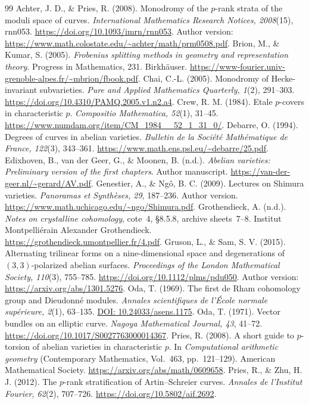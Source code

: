 \documentclass[11pt]{article}
\theoremstyle{definition}\newtheorem{definition}[theorem]{Definition}
\theoremstyle{remark}\newtheorem{remark}[theorem]{Remark}
\begin{document}
\begin{thebibliography}{99}
Achter, J. D., \& Pries, R. (2008). Monodromy of the $p$-rank strata of the moduli space of curves. \emph{International Mathematics Research Notices, 2008}(15), rnn053. \url{https://doi.org/10.1093/imrn/rnn053}. Author version: \url{https://www.math.colostate.edu/~achter/math/prm0508.pdf}.
Brion, M., \& Kumar, S. (2005). \emph{Frobenius splitting methods in geometry and representation theory}. Progress in Mathematics, 231. Birkh\"auser. \url{https://www-fourier.univ-grenoble-alpes.fr/~mbrion/fbook.pdf}.
Chai, C.-L. (2005). Monodromy of Hecke-invariant subvarieties. \emph{Pure and Applied Mathematics Quarterly, 1}(2), 291--303. \url{https://doi.org/10.4310/PAMQ.2005.v1.n2.a4}.
Crew, R. M. (1984). Etale $p$-covers in characteristic $p$. \emph{Compositio Mathematica, 52}(1), 31--45. \url{https://www.numdam.org/item/CM_1984__52_1_31_0/}.
Debarre, O. (1994). Degrees of curves in abelian varieties. \emph{Bulletin de la Soci\'et\'e Math\'ematique de France, 122}(3), 343--361. \url{https://www.math.ens.psl.eu/~debarre/25.pdf}.
Edixhoven, B., van der Geer, G., \& Moonen, B. (n.d.). \emph{Abelian varieties: Preliminary version of the first chapters}. Author manuscript. \url{https://van-der-geer.nl/~gerard/AV.pdf}.
Genestier, A., \& Ng{\^o}, B. C. (2009). Lectures on Shimura varieties. \emph{Panoramas et Synth\`eses, 29}, 187--236. Author version. \url{https://www.math.uchicago.edu/~ngo/Shimura.pdf}.
Grothendieck, A. (n.d.). \emph{Notes on crystalline cohomology}, cote~4, \S8.5.8, archive sheets~7--8. Institut Montpelli\'erain Alexander Grothendieck. \url{https://grothendieck.umontpellier.fr/4.pdf}.
Gruson, L., \& Sam, S. V. (2015). Alternating trilinear forms on a nine-dimensional space and degenerations of $(3,3)$-polarized abelian surfaces. \emph{Proceedings of the London Mathematical Society, 110}(3), 755--785. \url{https://doi.org/10.1112/plms/pdu050}. Author version: \url{https://arxiv.org/abs/1301.5276}.
Oda, T. (1969). The first de Rham cohomology group and Dieudonn\'e modules. \emph{Annales scientifiques de l'\'Ecole normale sup\'erieure, 2}(1), 63--135. \href{https://doi.org/10.24033/asens.1175}{DOI: 10.24033/asens.1175}.
Oda, T. (1971). Vector bundles on an elliptic curve. \emph{Nagoya Mathematical Journal, 43}, 41--72. \url{https://doi.org/10.1017/S0027763000014367}.
Pries, R. (2008). A short guide to $p$-torsion of abelian varieties in characteristic $p$. In \emph{Computational arithmetic geometry} (Contemporary Mathematics, Vol.~463, pp.~121--129). American Mathematical Society. \url{https://arxiv.org/abs/math/0609658}.
Pries, R., \& Zhu, H. J. (2012). The $p$-rank stratification of Artin--Schreier curves. \emph{Annales de l'Institut Fourier, 62}(2), 707--726. \url{https://doi.org/10.5802/aif.2692}.


\end{thebibliography}
\end{document}
